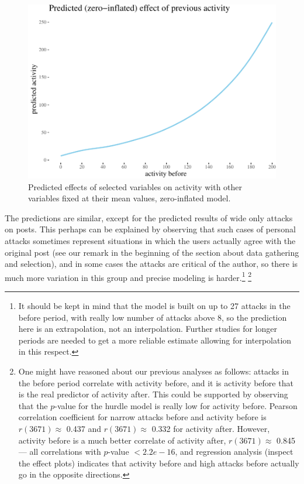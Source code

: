 \documentclass[a4paper,fleqn]{cas-dc}
\begin{document}
\begin{figure}

\begin{center}\includegraphics[width=0.85\linewidth]{images/unnamed-chunk-56-1} \end{center}
\caption{Predicted effects of selected variables on activity with other variables fixed at their mean values, zero-inflated model.}
\label{fig:effects2}
\end{figure}




The predictions are similar, except for the predicted results of wide
only attacks on posts. This perhaps can be explained by observing that
such cases of personal attacks sometimes represent situations in which
the users actually agree with the original post (see our remark in the
beginning of the section about data gathering and selection), and in
some cases the attacks are critical of the author, so there is much more
variation in this group and precise modeling is
harder.\footnote{It should be kept in mind that  the model is built on up to 27 attacks in the \textsf{before} period, with really low number of attacks above 8, so the prediction here is an extrapolation, not an interpolation. Further studies for longer periods are needed to get a more reliable estimate allowing for interpolation in this respect.}
\footnote{One might have reasoned about our previous analyses as follows:  attacks in the before period correlate with activity before, and it is activity before that is the real predictor of activity after. This could be supported by observing that the $p$-value for the hurdle model is really low for activity before.  Pearson correlation coefficient for narrow attacks before and activity before is $r(3671)\approx$ 0.437 and   $r(3671)\approx$ 
0.332 for activity after. However, activity before is a much better correlate of activity after, $r(3671)\approx$ 
0.845 --- all correlations with $p$-value $<2.2e-16$, and regression analysis (inspect the effect plots) indicates that activity before and high attacks before actually go in the opposite directions.}
\end{document}
